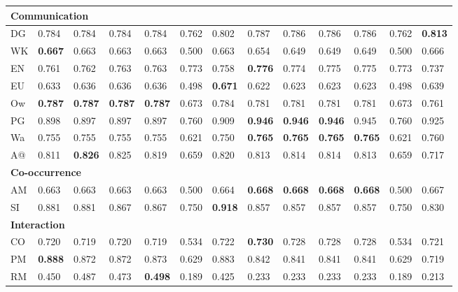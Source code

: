 \begin{longtable}{ lllllllllllll }
\hline
\multicolumn{13}{|l|}{\textbf{Communication}} \\
\hline
\textsf{DG}                   & 0.784 & 0.784 & 0.784 & 0.784 & 0.762 & 0.802 & 0.787 & 0.786 & 0.786 & 0.786 & 0.762 & \bf{0.813} \\
\textsf{WK}                   & \bf{0.667} & 0.663 & 0.663 & 0.663 & 0.500 & 0.663 & 0.654 & 0.649 & 0.649 & 0.649 & 0.500 & 0.666 \\
\textsf{EN}                   & 0.761 & 0.762 & 0.763 & 0.763 & 0.773 & 0.758 & \bf{0.776} & 0.774 & 0.775 & 0.775 & 0.773 & 0.737 \\
\textsf{EU}                   & 0.633 & 0.636 & 0.636 & 0.636 & 0.498 & \bf{0.671} & 0.622 & 0.623 & 0.623 & 0.623 & 0.498 & 0.639 \\
\textsf{Ow}                   & \bf{0.787} & \bf{0.787} & \bf{0.787} & \bf{0.787} & 0.673 & 0.784 & 0.781 & 0.781 & 0.781 & 0.781 & 0.673 & 0.761 \\
\textsf{PG}                   & 0.898 & 0.897 & 0.897 & 0.897 & 0.760 & 0.909 & \bf{0.946} & \bf{0.946} & \bf{0.946} & 0.945 & 0.760 & 0.925 \\
\textsf{Wa}                   & 0.755 & 0.755 & 0.755 & 0.755 & 0.621 & 0.750 & \bf{0.765} & \bf{0.765} & \bf{0.765} & \bf{0.765} & 0.621 & 0.760 \\
\textsf{A@}                   & 0.811 & \bf{0.826} & 0.825 & 0.819 & 0.659 & 0.820 & 0.813 & 0.814 & 0.814 & 0.813 & 0.659 & 0.717 \\

\hline
\multicolumn{13}{|l|}{\textbf{Co-occurrence}} \\
\hline
\textsf{AM}                   & 0.663 & 0.663 & 0.663 & 0.663 & 0.500 & 0.664 & \bf{0.668} & \bf{0.668} & \bf{0.668} & \bf{0.668} & 0.500 & 0.667 \\
\textsf{SI}                   & 0.881 & 0.881 & 0.867 & 0.867 & 0.750 & \bf{0.918} & 0.857 & 0.857 & 0.857 & 0.857 & 0.750 & 0.830 \\

\hline
\multicolumn{13}{|l|}{\textbf{Interaction}} \\
\hline
\textsf{CO}                   & 0.720 & 0.719 & 0.720 & 0.719 & 0.534 & 0.722 & \bf{0.730} & 0.728 & 0.728 & 0.728 & 0.534 & 0.721 \\
\textsf{PM}                   & \bf{0.888} & 0.872 & 0.872 & 0.873 & 0.629 & 0.883 & 0.842 & 0.841 & 0.841 & 0.841 & 0.629 & 0.719 \\
\textsf{RM}                   & 0.450 & 0.487 & 0.473 & \bf{0.498} & 0.189 & 0.425 & 0.233 & 0.233 & 0.233 & 0.233 & 0.189 & 0.213 \\


\end{longtable}
